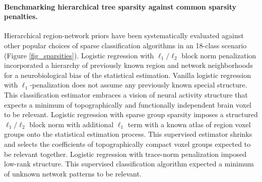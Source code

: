 \documentclass{article}
\begin{document}
\paragraph{Benchmarking hierarchical tree sparsity against
common sparsity penalties.}
Hierarchical region-network priors have been systematically
evaluated against other popular choices of sparse classification algorithms
in an 18-class scenario
(Figure \ref{fig_sparsities}).
%
Logistic regression with $\ell_1/\ell_2$ block norm penalization
incorporated a hierarchy of previously known region and network neighborhoods
for a neurobiological bias of the statistical estimation.
%
Vanilla logistic regression with $\ell_1$-penalization
does not assume any previously known special structure.
This classification estimator embraces a vision of neural activity structure
that expects a minimum of
topographically and functionally independent brain voxel to be relevant.
%
Logistic regression with sparse group sparsity
imposes a structured $\ell_1/\ell_2$ block norm with additional $\ell_1$ term
with a known atlas of region voxel groups onto the statistical estimation process.
This supervised estimator shrinks and selects the coefficients
of topographically compact voxel groups expected to be relevant together.
%
Logistic regression with trace-norm penalization
imposed low-rank structure.
This supervised classification algorithm
expected a minimum of unknown network patterns
to be relevant.
%
\end{document}

